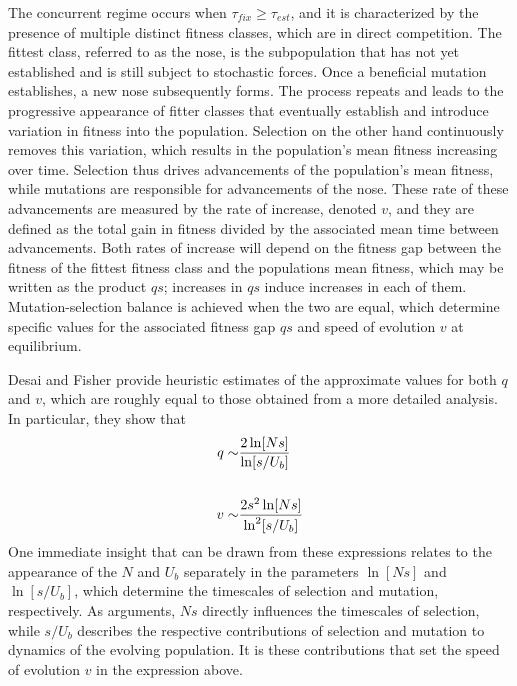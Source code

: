 \documentclass[12pt, one column]{article}
\begin{document}
The concurrent regime occurs when $\tau_{fix} \ge \tau_{est}$, and it is characterized by the presence of multiple distinct fitness classes, which are in direct competition.  The fittest class, referred to as the nose, is the subpopulation that has not yet established and is still subject to stochastic forces.  Once a beneficial mutation establishes, a new nose subsequently forms.  The process repeats and leads to the progressive appearance of fitter classes that eventually establish and introduce variation in fitness into the population.  Selection on the other hand continuously removes this variation, which results in the population's mean fitness increasing over time.  Selection thus drives advancements of the population's mean fitness, while mutations are responsible for advancements of the nose.  These rate of these advancements are measured by the rate of increase, denoted $v$, and they are defined as the total gain in fitness divided by the associated mean time between advancements.  Both rates of increase will depend on the fitness gap between the fitness of the fittest fitness class and the populations mean fitness, which may be written as the product $qs$; increases in $qs$ induce increases in each of them.  Mutation-selection balance is achieved when the two are equal, which determine specific values for the associated fitness gap $qs$ and speed of evolution $v$ at equilibrium. 

Desai and Fisher provide heuristic estimates of the approximate values for both $q$ and $v$, which are roughly equal to those obtained from a more detailed analysis.  In particular, they show that
\begin{equation}
\begin{aligned}
q \sim & {2\ln[Ns] \over \ln[s/U_b]} \\   
\\
v \sim & {2s^2\ln[Ns] \over \ln^2[s/U_b]}
\end{aligned}
\end{equation}
One immediate insight that can be drawn from these expressions relates to the appearance of the $N$ and $U_b$ separately in the parameters $\ln[Ns]$ and $\ln[s/U_b]$, which determine the timescales of selection and mutation, respectively.  As arguments, $Ns$ directly influences the timescales of selection, while $s/U_b$ describes the respective contributions of selection and mutation to dynamics of the evolving population.  It is these contributions that set the speed of evolution $v$ in the expression above.   
\end{document}

